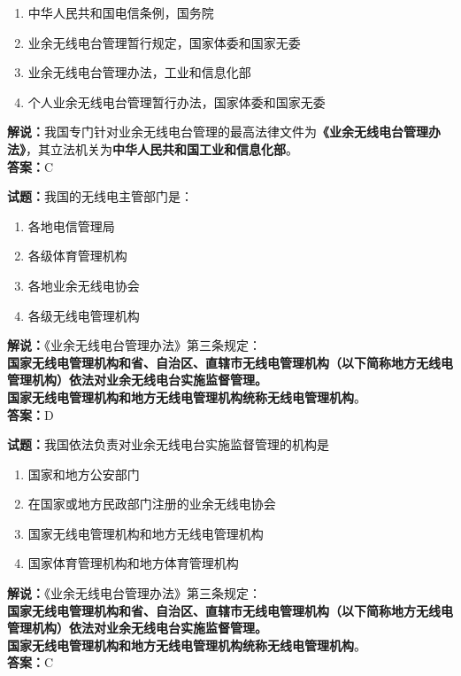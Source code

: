 \documentclass{ctexbook}
\begin{document}
\begin{enumerate}[leftmargin=3em]
  \item 中华人民共和国电信条例，国务院
  \item 业余无线电台管理暂行规定，国家体委和国家无委
  \item 业余无线电台管理办法，工业和信息化部
  \item 个人业余无线电台管理暂行办法，国家体委和国家无委
\end{enumerate}

\noindent\textbf{解说：}我国专门针对业余无线电台管理的最高法律文件为\textbf{《业余无线电台管理办法》}，其立法机关为\textbf{中华人民共和国工业和信息化部}。\\\noindent\textbf{答案：}C

\bigskip

\noindent\textbf{试题：}我国的无线电主管部门是：

\begin{enumerate}[leftmargin=3em]
  \item 各地电信管理局
  \item 各级体育管理机构
  \item 各地业余无线电协会
  \item 各级无线电管理机构
\end{enumerate}
\noindent\textbf{解说：}《业余无线电台管理办法》第三条规定：\\\textbf{国家无线电管理机构和省、自治区、直辖市无线电管理机构（以下简称地方无线电管理机构）依法对业余无线电台实施监督管理。\\
  国家无线电管理机构和地方无线电管理机构统称无线电管理机构}。\\\noindent\textbf{答案：}D

\bigskip

\noindent\textbf{试题：}我国依法负责对业余无线电台实施监督管理的机构是

\begin{enumerate}[leftmargin=3em]
  \item 国家和地方公安部门
  \item 在国家或地方民政部门注册的业余无线电协会
  \item 国家无线电管理机构和地方无线电管理机构
  \item 国家体育管理机构和地方体育管理机构
\end{enumerate}

\noindent\textbf{解说：}《业余无线电台管理办法》第三条规定：\\\textbf{国家无线电管理机构和省、自治区、直辖市无线电管理机构（以下简称地方无线电管理机构）依法对业余无线电台实施监督管理。\\
  国家无线电管理机构和地方无线电管理机构统称无线电管理机构}。\\\noindent\textbf{答案：}C
\end{document}
